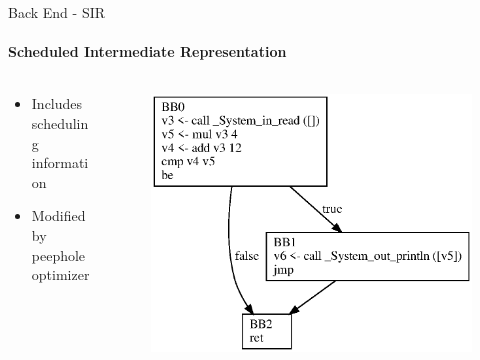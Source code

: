 \documentclass[en,16:9]{sdqbeamer}
\begin{document}
\begin{frame}{Back End - SIR}
	\framesubtitle{Scheduled Intermediate Representation}
	
	\begin{columns}
		\begin{column}{0.3\textwidth}
			\begin{itemize}
				\item Includes scheduling information
				\item Modified by peephole optimizer
			\end{itemize}
		\end{column}
	
		\begin{column}{0.5\textwidth}
			\begin{figure}
				\centering
				\includegraphics[scale=0.6]{images/sir-before-reg-alloc}
			\end{figure}
		\end{column}
	\end{columns}
	
\end{frame}
\end{document}
